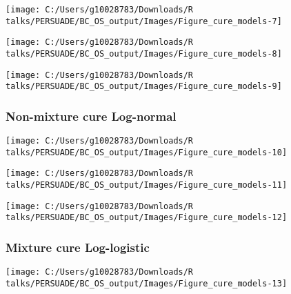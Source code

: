 \documentclass[
]{article}
\begin{document}
\begin{flushleft}\texttt{[image: C:/Users/g10028783/Downloads/R talks/PERSUADE/BC\_OS\_output/Images/Figure\_cure\_models-7]} \end{flushleft}

\begin{flushleft}\texttt{[image: C:/Users/g10028783/Downloads/R talks/PERSUADE/BC\_OS\_output/Images/Figure\_cure\_models-8]} \end{flushleft}

\begin{flushleft}\texttt{[image: C:/Users/g10028783/Downloads/R talks/PERSUADE/BC\_OS\_output/Images/Figure\_cure\_models-9]} \end{flushleft}

\clearpage

\subsubsection{Non-mixture cure
Log-normal}\label{non-mixture-cure-log-normal}

\begin{flushleft}\texttt{[image: C:/Users/g10028783/Downloads/R talks/PERSUADE/BC\_OS\_output/Images/Figure\_cure\_models-10]} \end{flushleft}

\begin{flushleft}\texttt{[image: C:/Users/g10028783/Downloads/R talks/PERSUADE/BC\_OS\_output/Images/Figure\_cure\_models-11]} \end{flushleft}

\begin{flushleft}\texttt{[image: C:/Users/g10028783/Downloads/R talks/PERSUADE/BC\_OS\_output/Images/Figure\_cure\_models-12]} \end{flushleft}

\clearpage

\subsubsection{Mixture cure
Log-logistic}\label{mixture-cure-log-logistic}

\begin{flushleft}\texttt{[image: C:/Users/g10028783/Downloads/R talks/PERSUADE/BC\_OS\_output/Images/Figure\_cure\_models-13]} \end{flushleft}
\end{document}
